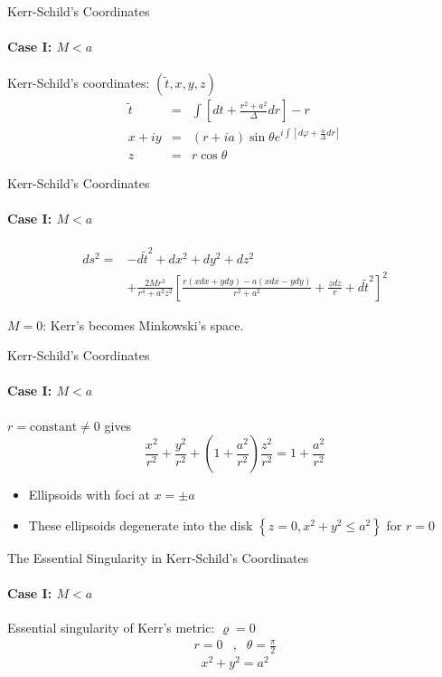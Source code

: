 \documentclass{beamer}
\begin{document}
    	\begin{frame}{Kerr-Schild's Coordinates}
        \framesubtitle{Case I: $M<a$}
            Kerr-Schild's coordinates: $\left(\tilde{t},x,y,z\right)$
            \pause
            \begin{eqnarray*}
            \tilde{t} & = & \int\left[dt+\frac{r^{2}+a^{2}}{\Delta}dr\right]-r\\
            x+iy & = & \left(r+ia\right)\sin\theta e^{i\int\left[d\varphi+\frac{a}{\Delta}dr\right]}\\
			z & = & r\cos\theta
			\end{eqnarray*}
        \end{frame}
        
		\begin{frame}{Kerr-Schild's Coordinates}
        \framesubtitle{Case I: $M<a$}
         	\begin{align*}
         	ds^{2} = &-d\tilde{t}^{2}+dx^{2}+dy^{2}+dz^{2} \\
  			&+\frac{2Mr^{3}}{r^{4}+a^{2}z^{2}}\left[\frac{r\left(xdx+ydy\right)-a\left(xdx-ydy\right)}{r^{2}+a^{2}}+\frac{zdz}{r}+d\tilde{t}^{2}\right]^{2}
 			\end{align*}
            \pause
            \bigskip
            
            $M=0$: Kerr's becomes Minkowski's space.
      	\end{frame}
        
        \begin{frame}{Kerr-Schild's Coordinates}
        \framesubtitle{Case I: $M<a$}
			$r=\mbox{constant}\neq0$ gives
$$\frac{x^{2}}{r^{2}}+\frac{y^{2}}{r^{2}}+\left(1+\frac{a^{2}}{r^{2}}\right)\frac{z^{2}}{r^{2}}=1+\frac{a^{2}}{r^{2}}$$
			\pause
            \begin{itemize}
            \item Ellipsoids with foci at $x=\pm a$
            \item These ellipsoids degenerate into the disk $\left\{ z=0,x^{2}+y^{2}\leq a^{2}\right\} $ for $r=0$
            \end{itemize}
        \end{frame}
        
        \begin{frame}{The Essential Singularity in Kerr-Schild's Coordinates}
        \framesubtitle{Case I: $M<a$}
			Essential singularity of Kerr's metric: $\varrho=0$
            \pause
			\begin{eqnarray*}
            r=0 & , & \theta=\frac{\pi}{2}
            \end{eqnarray*}            
            \pause
			$$x^{2}+y^{2}=a^{2}$$
            \pause
        \end{frame}
        
\end{document}
